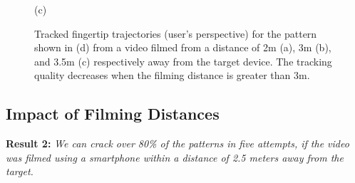 \begin{figure}[!ht]
{\begin{minipage}[b]{3.8cm}
                \centering \footnotesize (c)
                \end{minipage}
            }
            \hspace{0.2cm}
                \vspace{-3mm}
            \caption{Tracked fingertip trajectories (user's perspective) for the pattern shown in (d) from a video filmed from a distance of 2m (a), 3m (b), and 3.5m (c) respectively away from the target device. The tracking quality decreases when the filming distance is greater than 3m. }
            \vspace{-3mm}
            \label{fig:distance-show}
        \end{figure}



    \subsection{Impact of Filming Distances \label{sec:distances}}


        \noindent \textbf{Result 2:} \emph{We can crack over 80\% of the patterns in five attempts, if the video was filmed using a smartphone within a distance of 2.5 meters away from the target.}

